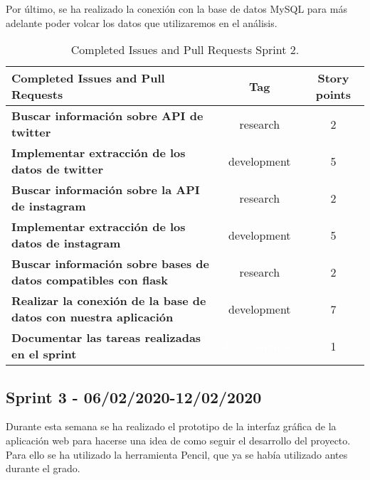 Por último, se ha realizado la conexión con la base de datos MySQL para más adelante poder volcar los datos que utilizaremos en el análisis.


\begin{table}[ht!]
    \centering
    \resizebox{15cm}{!} {
    \begin{tabular}{|l|c|c|}
    \hline
    \rowcolor[rgb]{0.81,0.81,0.77}
    \textbf{Completed Issues and Pull Requests}     &\textbf{Tag}     & \textbf{Story points} \\ \hline
    \textbf{Buscar información sobre API de twitter}         &\cellcolor[rgb]{0.6,1.0,0.6}research      &2 \\ \hline 
    \textbf{Implementar extracción de los datos de twitter}         &\cellcolor[rgb]{0.69,0.93,0.93}development      &5 \\ \hline
    \textbf{Buscar información sobre la API de instagram}         &\cellcolor[rgb]{0.6,1.0,0.6}research      &2 \\ \hline 
    \textbf{Implementar extracción de los datos de instagram}         &\cellcolor[rgb]{0.69,0.93,0.93}development      &5 \\ \hline 
    \textbf{Buscar información sobre bases de datos compatibles con flask}         &\cellcolor[rgb]{0.6,1.0,0.6}research      &2 \\ \hline 
    \textbf{Realizar la conexión de la base de datos con nuestra aplicación}         &\cellcolor[rgb]{0.69,0.93,0.93}development      &7 \\ \hline 
    \textbf{Documentar las tareas realizadas en el sprint}         &\cellcolor[rgb]{0.0,0.33,0.71}\textcolor{white}{documentation}      &1 \\ \hline 
    \end{tabular}}
    \caption{Completed Issues and Pull Requests Sprint 2.}
    \label{tab:my_label}
\end{table}

\subsection{Sprint 3 - 06/02/2020-12/02/2020}
Durante esta semana se ha realizado el prototipo de la interfaz gráfica de la aplicación web para hacerse una idea de como seguir el desarrollo del proyecto.
Para ello se ha utilizado la herramienta Pencil, que ya se había utilizado antes durante el grado.

